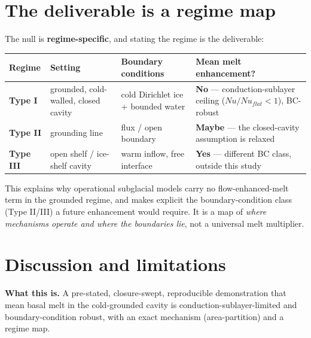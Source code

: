 \documentclass[tc, manuscript]{copernicus}
\begin{document}
\section{The deliverable is a regime map}

The null is \textbf{regime-specific}, and stating the regime is the deliverable:

\begin{center}\small
\begin{tabularx}{\linewidth}{>{\raggedright\arraybackslash}X>{\raggedright\arraybackslash}X>{\raggedright\arraybackslash}X>{\raggedright\arraybackslash}X}
\hline
Regime & Setting & Boundary conditions & Mean melt enhancement? \\
\hline
\textbf{Type I} & grounded, cold-walled, closed cavity & cold Dirichlet ice + bounded water & \textbf{No} — conduction-sublayer ceiling ($Nu/Nu_{flat}<1$), BC-robust \\
\textbf{Type II} & grounding line & flux / open boundary & \textbf{Maybe} — the closed-cavity assumption is relaxed \\
\textbf{Type III} & open shelf / ice-shelf cavity & warm inflow, free interface & \textbf{Yes} — different BC class, outside this study \\
\hline
\end{tabularx}
\end{center}

This explains why operational subglacial models carry no flow-enhanced-melt term in the grounded regime, and makes explicit the boundary-condition class (Type II/III) a future enhancement would require. It is a map of \emph{where mechanisms operate and where the boundaries lie}, not a universal melt multiplier.

\section{Discussion and limitations}

\textbf{What this is.} A pre-stated, closure-swept, reproducible demonstration that mean basal melt in the cold-grounded cavity is conduction-sublayer-limited and boundary-condition robust, with an exact mechanism (area-partition) and a regime map.
\end{document}
